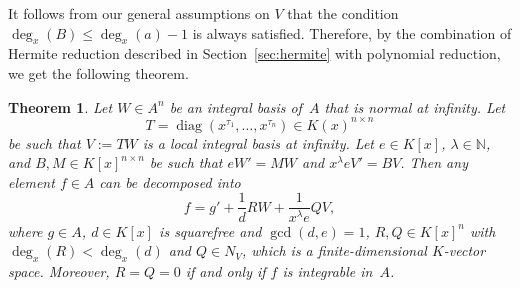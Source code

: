 \documentclass[final,1p,times,authoryear]{elsarticle}
\newtheorem{theorem}{Theorem}
\newcommand{\bN}{ {\mathbb N}}
\def\diag{\operatorname{diag}}
\begin{document}
It follows from our general assumptions on $V$ that the
condition $\deg_x(B) \leq \deg_x(a)-1$ is always satisfied.
Therefore, by the combination of Hermite reduction described in Section~\ref{sec:hermite}
with polynomial reduction, we get the following theorem.


\begin{theorem}\label{THM:polyred}
Let $W\in A^n$ be an integral basis of~$A$ that is normal at infinity.
Let
\[
T = \diag(x^{\tau_1}, \ldots, x^{\tau_n}) \in K(x)^{n\times n}
\]
be such that $V := TW$ is a local integral basis at infinity.  Let $e\in K[x]$,
$\lambda \in \bN$, and $B, M \in K[x]^{n \times n} $ be such that $eW' = MW$
and $x^\lambda eV' = BV$.  Then any element $f\in A$ can be decomposed into
\begin{equation}\label{EQ:add}
  f = g' + \frac{1}{d} RW + \frac{1}{x^\lambda e} QV,
\end{equation}
where $g\in A$, $d\in K[x]$ is squarefree and $\gcd(d, e)=1$, $R, Q\in K[x]^n$
with $\deg_x(R) < \deg_x(d)$ and $Q\in N_V$, which is a finite-dimensional
$K$-vector space. Moreover, $R=Q=0$ if and only if $f$ is integrable in~$A$.
\end{theorem}
\end{document}
